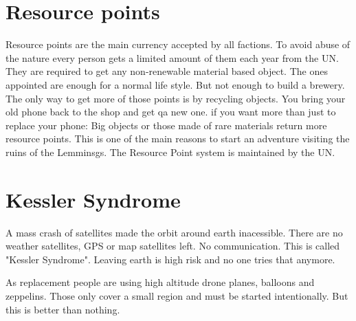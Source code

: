\section{Resource points}
\label{sec:Resource Points}
Resource points are the main currency accepted by all factions. To avoid abuse of the nature every person gets a limited amount of them each year from the UN. They are required to get any non-renewable material based object. The ones appointed are enough for a normal life style. But not enough to build a brewery. The only way to get more of those points is by recycling objects. You bring your old phone back to the shop and get qa new one. if you want more than just to replace your phone: Big objects or those made of rare materials return more resource points. This is one of the main reasons to start an adventure visiting the ruins of the Lemminsgs. The Resource Point system is maintained by the UN.



\section{Kessler Syndrome}
\label{sec: Kessler Syndrome}
A mass crash of satellites made the orbit around earth inacessible. There are no weather satellites, GPS or map satellites left. No communication.
This is called "Kessler Syndrome". Leaving earth is high risk and no one tries that anymore.

As replacement people are using high altitude drone planes, balloons and zeppelins. Those only cover a small region and must be started intentionally. But this is better than nothing.